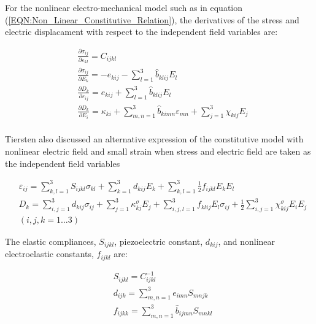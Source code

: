 For the nonlinear electro-mechanical model such as in equation (\ref{EQN:Non_Linear_Constitutive_Relation}),
the derivatives of the stress and electric displacament with respect to the independent field variables are:

\begin{equation}
\begin{aligned}
&\frac{\partial \sigma_{ij}}{\partial \varepsilon_{kl}}=C_{ijkl} \\
&\frac{\partial \sigma_{ij}}{\partial E_{k}}=
-e_{kij}-
\sum_{l=1}^3 \hat{b}_{klij} E_l\\
&\frac{\partial D_{k}}{\partial \varepsilon_{ij}}=
e_{kij}+
\sum_{l=1}^3 \hat{b}_{klij} E_l \\
&\frac{\partial D_{k}}{\partial E_{i}}=
\kappa_{ki}+
\sum_{m,n=1}^3 \hat{b}_{kimn}\varepsilon _{mn}+
\sum_{j=1}^3 \chi_{kij} E_j\\
\end{aligned}
\label{EQN:Non_LinearLinear_Constants}
\end{equation}

Tiersten \cite{tiersten1993electroelastic} also discussed an alternative expression of the constitutive model with nonlinear electric field and small strain when stress and 
 electric field are taken as the independent field variables

\begin{equation}
\begin{aligned}
&\varepsilon _{ij} = 
\sum_{k,l=1}^3 {S_{ijkl}}{\sigma_{kl}} + 
\sum_{k=1}^3 d_{kij}{E_k} +
\sum_{k,l=1}^3 \frac{1}{2}{f}_{ijkl}{E_k}{E_l}\\
&{D_k} =  
\sum_{i,j=1}^3 {d_{kij}}{\sigma_{ij}} + 
\sum_{j=1}^3 {\kappa^{\sigma}_{kj}}{E_j}+
\sum_{i,j,l=1}^3 {f}_{klij}{E_l} \sigma _{ij}+\frac{1}{2} 
\sum_{i,j=1}^3 \chi^{\sigma}_{kij}{E_i}{E_j} \\
& (i,j,k=1 \dots 3)  
\end{aligned}
\label{EQN:Non_Linear_Constitutive_Relation_strain_bases}
\end{equation}

The elastic compliances, $S_{ijkl}$, piezoelectric constant, $d_{kij}$, and nonlinear electroelastic constants, ${f}_{ijkl}$ are:

\begin{equation}
\begin{aligned}
& S_{ijkl} =  C^{-1}_{ijkl} \\
& d_{ijk} = \sum_{m,n=1}^3 e_{imn} S_{mnjk} \\
& f_{ijkk} =\sum_{m,n=1}^3 \hat{b}_{ijmn} S_{mnkl}
\end{aligned}
\label{EQN:Non_relation_with_constants_1}  
\end{equation}

